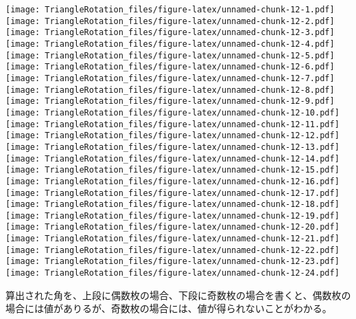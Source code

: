 \documentclass[]{article}
\newenvironment{Shaded}{\begin{snugshade}}{\end{snugshade}}
\newcommand{\KeywordTok}[1]{\textcolor[rgb]{0.13,0.29,0.53}{\textbf{#1}}}
\newcommand{\DataTypeTok}[1]{\textcolor[rgb]{0.13,0.29,0.53}{#1}}
\newcommand{\DecValTok}[1]{\textcolor[rgb]{0.00,0.00,0.81}{#1}}
\newcommand{\StringTok}[1]{\textcolor[rgb]{0.31,0.60,0.02}{#1}}
\newcommand{\ControlFlowTok}[1]{\textcolor[rgb]{0.13,0.29,0.53}{\textbf{#1}}}
\newcommand{\OperatorTok}[1]{\textcolor[rgb]{0.81,0.36,0.00}{\textbf{#1}}}
\newcommand{\NormalTok}[1]{#1}
\begin{document}
\texttt{[image: TriangleRotation\_files/figure-latex/unnamed-chunk-12-1.pdf]}
\texttt{[image: TriangleRotation\_files/figure-latex/unnamed-chunk-12-2.pdf]}
\texttt{[image: TriangleRotation\_files/figure-latex/unnamed-chunk-12-3.pdf]}
\texttt{[image: TriangleRotation\_files/figure-latex/unnamed-chunk-12-4.pdf]}
\texttt{[image: TriangleRotation\_files/figure-latex/unnamed-chunk-12-5.pdf]}
\texttt{[image: TriangleRotation\_files/figure-latex/unnamed-chunk-12-6.pdf]}
\texttt{[image: TriangleRotation\_files/figure-latex/unnamed-chunk-12-7.pdf]}
\texttt{[image: TriangleRotation\_files/figure-latex/unnamed-chunk-12-8.pdf]}
\texttt{[image: TriangleRotation\_files/figure-latex/unnamed-chunk-12-9.pdf]}
\texttt{[image: TriangleRotation\_files/figure-latex/unnamed-chunk-12-10.pdf]}
\texttt{[image: TriangleRotation\_files/figure-latex/unnamed-chunk-12-11.pdf]}
\texttt{[image: TriangleRotation\_files/figure-latex/unnamed-chunk-12-12.pdf]}
\texttt{[image: TriangleRotation\_files/figure-latex/unnamed-chunk-12-13.pdf]}
\texttt{[image: TriangleRotation\_files/figure-latex/unnamed-chunk-12-14.pdf]}
\texttt{[image: TriangleRotation\_files/figure-latex/unnamed-chunk-12-15.pdf]}
\texttt{[image: TriangleRotation\_files/figure-latex/unnamed-chunk-12-16.pdf]}
\texttt{[image: TriangleRotation\_files/figure-latex/unnamed-chunk-12-17.pdf]}
\texttt{[image: TriangleRotation\_files/figure-latex/unnamed-chunk-12-18.pdf]}
\texttt{[image: TriangleRotation\_files/figure-latex/unnamed-chunk-12-19.pdf]}
\texttt{[image: TriangleRotation\_files/figure-latex/unnamed-chunk-12-20.pdf]}
\texttt{[image: TriangleRotation\_files/figure-latex/unnamed-chunk-12-21.pdf]}
\texttt{[image: TriangleRotation\_files/figure-latex/unnamed-chunk-12-22.pdf]}
\texttt{[image: TriangleRotation\_files/figure-latex/unnamed-chunk-12-23.pdf]}
\texttt{[image: TriangleRotation\_files/figure-latex/unnamed-chunk-12-24.pdf]}

算出された角を、上段に偶数枚の場合、下段に奇数枚の場合を書くと、偶数枚の場合には値がありるが、奇数枚の場合には、値が得られないことがわかる。

\begin{Shaded}
\end{Shaded}
\end{document}
